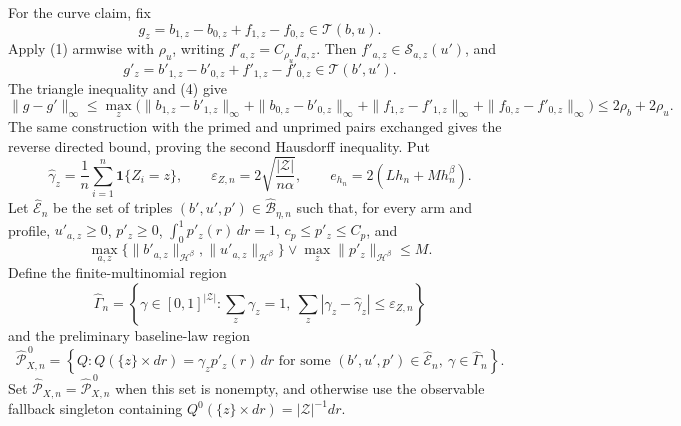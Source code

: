 For the curve claim, fix
\[
g_z=b_{1,z}-b_{0,z}+f_{1,z}-f_{0,z}\in\mathcal T(b,u).
\]
Apply (1) armwise with \(\rho_u\), writing \(f'_{a,z}=C_{\rho_u}f_{a,z}\).  Then \(f'_{a,z}\in\mathcal S_{a,z}(u')\), and
\[
g'_z=b'_{1,z}-b'_{0,z}+f'_{1,z}-f'_{0,z}\in\mathcal T(b',u').
\]
The triangle inequality and (4) give
\[
\|g-g'\|_\infty
\leq \max_z\bigl(\|b_{1,z}-b'_{1,z}\|_\infty
+\|b_{0,z}-b'_{0,z}\|_\infty
+\|f_{1,z}-f'_{1,z}\|_\infty
+\|f_{0,z}-f'_{0,z}\|_\infty\bigr)
\leq2\rho_b+2\rho_u.
\tag{5}
\]
The same construction with the primed and unprimed pairs exchanged gives the reverse directed bound, proving the second Hausdorff inequality.
Put
\[
\widehat\gamma_z=\frac1n\sum_{i=1}^n\mathbf 1\{Z_i=z\},
\qquad
\varepsilon_{Z,n}=2\sqrt{\frac{|\mathcal Z|}{n\alpha}},
\qquad
e_{h_n}=2(Lh_n+Mh_n^\beta).
\]
Let \(\widehat{\mathcal E}_n\) be the set of triples \((b',u',p')\in\widehat{\mathcal B}_{\eta,n}\) such that, for every arm and profile, \(u'_{a,z}\geq0\), \(p'_z\geq0\), \(\int_0^1p'_z(r)\,dr=1\), \(c_p\leq p'_z\leq C_p\), and
\[
\max_{a,z}\{\|b'_{a,z}\|_{\mathcal H^\beta},\|u'_{a,z}\|_{\mathcal H^\beta}\}
\vee\max_z\|p'_z\|_{\mathcal H^\beta}\leq M.
\]
Define the finite-multinomial region
\[
\widehat\Gamma_n=
\left\{\gamma\in[0,1]^{|\mathcal Z|}:\sum_z\gamma_z=1,
\ \sum_z|\gamma_z-\widehat\gamma_z|\leq\varepsilon_{Z,n}\right\}
\]
and the preliminary baseline-law region
\[
\widehat{\mathcal P}^{\,0}_{X,n}
=\left\{Q:Q(\{z\}\times dr)=\gamma_zp'_z(r)\,dr
\text{ for some }(b',u',p')\in\widehat{\mathcal E}_n,
\ \gamma\in\widehat\Gamma_n\right\}.
\]
Set \(\widehat{\mathcal P}_{X,n}=\widehat{\mathcal P}^{\,0}_{X,n}\) when this set is nonempty, and otherwise use the observable fallback singleton containing \(Q^0(\{z\}\times dr)=|\mathcal Z|^{-1}dr\).

